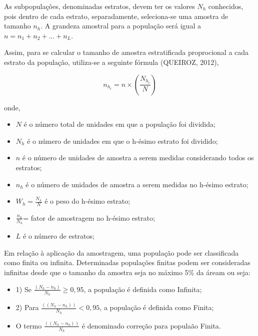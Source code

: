 As subpopulações, denominadas estratos, devem ter os valores
$N_{h}$ conhecidos, pois dentro de cada estrato, separadamente,
seleciona-se uma amostra de tamanho $n_{h}$. A grandeza amostral
para a população será igual a $n=n_{1}+n_{2}+\ldots+n_{L}$.
\vskip0.3cm

Assim, para se calcular o tamanho de amostra estratificada
proprocional a cada estrato da população, utiliza-se a seguinte
fórmula (QUEIROZ, 2012),

\begin{equation}\label{amostestra}
n_{h_{i}} = n \times \left ( \frac{N_{h_{i}}}{N} \right )
\end{equation}

onde, 

\begin{itemize}
\item $N$ é o número total de unidades em que a população foi dividida;
\item $N_{h}$ é o número de unidades em que o h-ésimo estrato foi dividido;
\item $n$ é o número de unidades de amostra a serem medidas considerando todos os estratos;
\item $n_{h}$ é o número de unidades de amostra a serem medidas no h-ésimo estrato;
\item $W_{h}={\frac{N_{h}}{N}}$ é o peso do h-ésimo estrato;
\item $\frac{n_{h}}{N_{h}}$= fator de amostragem no h-ésimo estrato; 
\item $L$ é o número de estratos;
\end{itemize}

Em relação à aplicação da amostragem, uma população pode ser classificada como finita ou infinita. Determinadas populações finitas podem ser consideradas infinitas desde que o tamanho da amostra seja no máximo 5\% da áream ou seja:

\begin{itemize}
    \item 1) Se $\frac{(N_{h}-n_{h})}{N_{h}} \geqslant 0,95$, a população é definida como Infinita; 
    \item 2) Para $\frac{((N_{h}-n_{h}))}{N_{h}} < 0,95$, a população é definida como Finita;
    \item O termo $\frac{((N_{h}-n_{h}))}{N_{h}}$ é denominado correção para populaão Finita.
\end{itemize}













